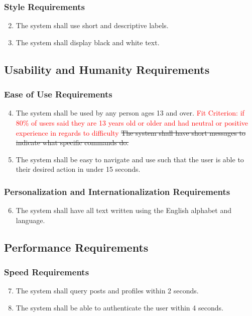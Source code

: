 \documentclass[12pt, titlepage]{article}
\begin{document}
\subsubsection{Style Requirements}
    \begin{enumerate}
    \setcounter{enumi}{1}
        \item The system shall use short and descriptive labels.
        \item The system shall display black and white text.
    \end{enumerate}
\subsection{Usability and Humanity Requirements}
\subsubsection{Ease of Use Requirements}
    \begin{enumerate}
    \setcounter{enumi}{3}
        \item The system shall be used by any person ages 13 and over. \textcolor{red}{Fit Criterion: if 80\% of users said they are 13 years old or older and had neutral or positive experience in regards to difficulty}
        \sout{The system shall have short messages to indicate what specific commands do.}
        \item The system shall be easy to navigate and use such that the user is able to their desired action in under 15 seconds.
    \end{enumerate}
\subsubsection{Personalization and Internationalization Requirements}
    \begin{enumerate}
    \setcounter{enumi}{5}
        \item The system shall have all text written using the English alphabet and language.
    \end{enumerate}

\subsection{Performance Requirements}
\subsubsection{Speed Requirements}
    \begin{enumerate}
    \setcounter{enumi}{6}
        \item The system shall query posts and profiles within 2 seconds.
        \item The system shall be able to authenticate the user within 4 seconds.
    \end{enumerate}
\end{document}
